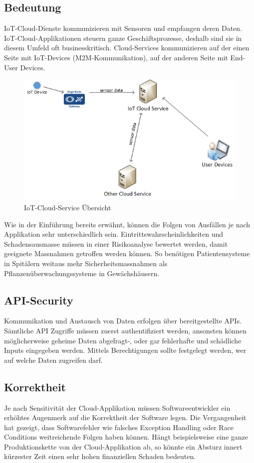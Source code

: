 \subsection{Bedeutung}
IoT-Cloud-Dienste kommunizieren mit Sensoren und empfangen deren Daten. IoT-Cloud-Applikationen steuern ganze Geschäftsprozesse, deshalb sind sie in diesem Umfeld oft businesskritisch. Cloud-Services kommunizieren auf der einen Seite mit IoT-Devices (M2M-Kommunikation), auf der anderen Seite mit End-User Devices.  
\begin{figure}[H]
\centering
\includegraphics[scale=0.8]{../02_Analyse/images/cloudservices.png}
\caption{IoT-Cloud-Service Übersicht}
\end{figure}

Wie in der Einführung bereits erwähnt, können die Folgen von Ausfällen je nach Applikation sehr unterschiedlich sein. Eintrittswahrscheinlichkeiten und Schadensausmasse müssen in einer Risikoanalyse bewertet werden, damit geeignete Massnahmen getroffen werden können. So benötigen Patientensysteme in Spitälern weitaus mehr Sicherheitsmassnahmen als Pflanzenüberwachungssysteme in Gewächshäusern.

\subsection{API-Security}
Kommunikation und Austausch von Daten erfolgen über bereitgestellte APIs. Sämtliche API Zugriffe müssen zuerst authentifiziert werden, ansonsten können möglicherweise geheime Daten abgefragt-, oder gar fehlerhafte und schädliche Inputs eingegeben werden. Mittels Berechtigungen sollte festgelegt werden, wer auf welche Daten zugreifen darf. 

\subsection{Korrektheit}
Je nach Sensitivität der Cloud-Applikation müssen Softwareentwickler ein erhöhtes Augenmerk auf die Korrektheit der Software legen. Die Vergangenheit hat gezeigt, dass Softwarefehler wie falsches Exception Handling oder Race Conditions weitreichende Folgen haben können. Hängt beispielsweise eine ganze Produktionskette von der Cloud-Applikation ab, so könnte ein Absturz innert kürzester Zeit einen sehr hohen finanziellen Schaden bedeuten. 

